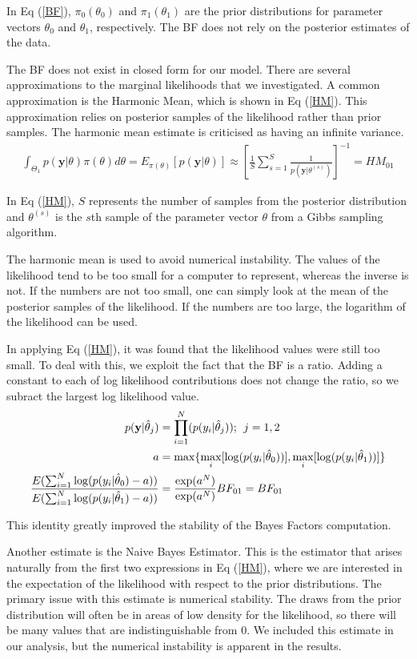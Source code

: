 \documentclass[10pt,letterpaper]{article}
\begin{document}
In Eq (\ref{BF}), \(\pi_0(\theta_0)\) and \(\pi_1(\theta_1)\) are
the prior distributions for parameter vectors \(\theta_0\) and
\(\theta_1\), respectively. The BF does not rely on the posterior
estimates of the data.

The BF does not exist in closed form for our model. There are several
approximations to the marginal likelihoods that we investigated. A
common approximation is the Harmonic Mean, which is shown in Eq
(\ref{HM}). This approximation relies on posterior samples of the
likelihood rather than prior samples. The harmonic mean estimate is
criticised as having an infinite variance.
\begin{align}
\int_{\Theta_1} p(\mathbf y | \theta)\pi(\theta)d\theta = E_{\pi(\theta)}[p(\mathbf y | \theta)] \approx {\left[\frac{1}{S}\sum_{s = 1}^S\frac{1}{p(\mathbf y | \theta^{(s)})}\right]}^{-1} = HM_{01}
\label{HM}
\end{align}

In Eq (\ref{HM}), \(S\) represents the number of samples from the
posterior distribution and \(\theta^{(s)}\) is the \(s\)th sample of the
parameter vector \(\theta\) from a Gibbs sampling algorithm.

The harmonic mean is used to avoid numerical instability. The values of
the likelihood tend to be too small for a computer to represent, whereas
the inverse is not. If the numbers are not too small, one can simply
look at the mean of the posterior samples of the likelihood. If the numbers are too large, the logarithm of the likelihood can be used.

In applying Eq (\ref{HM}), it was found that the likelihood values
were still too small. To deal with this, we exploit the fact that the BF
is a ratio. Adding a constant to each of log likelihood contributions
does not change the ratio, so we subract the largest log likelihood
value.
\begin{align}
p(\mathbf y |\hat\theta_j) &= \prod_{i = 1}^N(p(y_i|\hat\theta_j))\text{;\; }j = 1,2\\
a &= \max\{\max_i[\log(p(y_i | \hat\theta_0))], \max_i[\log(p( y_i | \hat\theta_1))]\}\\
\frac{E(\sum_{i=1}^N\log(p(y_i|\hat\theta_0) - a))}{E(\sum_{i=1}^N\log(p(y_i|\hat\theta_1) - a))} &=\frac{\exp(a^N)}{\exp(a^N)} BF_{01} = BF_{01}
\end{align}

This identity greatly improved the stability of the Bayes Factors
computation.

Another estimate is the Naive Bayes Estimator. This is the estimator
that arises naturally from the first two expressions in Eq (\ref{HM}), where we are interested
in the expectation of the likelihood with respect to the prior
distributions. The primary issue with this estimate is numerical
stability. The draws from the prior distribution will often be in areas
of low density for the likelihood, so there will be many values that are
indistinguishable from 0. We included this estimate in our analysis, but
the numerical instability is apparent in the results.
\end{document}
